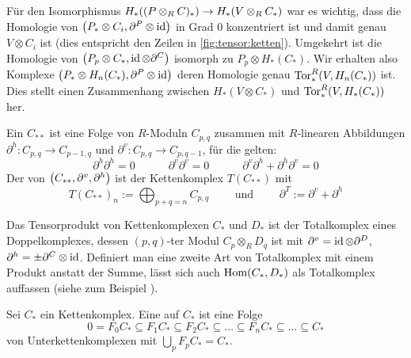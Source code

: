 \begin{bemerkung}[{name=[zu \autoref{lem:projaufl_iso_hom}]}]
	Für den Isomorphismus $H_*\enbrace*{(P \otimes_R C)_*} \to H_*(V \otimes_R C_*)$ war es wichtig, dass die Homologie von $\enbrace*{P_* \otimes C_i,\partial^P \otimes \id}$ in Grad $0$ konzentriert ist und damit genau $V \otimes C_i$ ist (dies entspricht den Zeilen in \cref{fig:tensor:ketten}).
	Umgekehrt ist die Homologie von $\enbrace*{P_p \otimes C_*, \id \otimes \partial^C}$ isomorph zu $P_p \otimes H_*(C_*)$.
	Wir erhalten also Komplexe $\enbrace*{P_* \otimes H_n(C_*), \partial^P \otimes \id}$ deren Homologie genau $\Tor^R_* \enbrace*{V, H_n(C_*)}$ ist.
	Dies stellt einen Zusammenhang zwischen $H_*(V \otimes C_*)$ und $\Tor_*^R \enbrace*{V, H_*(C_*)}$ her.
\end{bemerkung}

\begin{definition}[{name=[Doppelkomplex und Totalkomplex]}]
	Ein  $C_{**}$ ist eine Folge von $R$-Moduln $C_{p,q}$ zusammen mit $R$-linearen Abbildungen $\partial^h \colon C_{p,q} \to C_{p-1,q}$ und $\partial^v \colon C_{p,q} \to C_{p,q-1}$, für die gelten:
	\[
		\partial^h  \partial^h =0 \qquad \quad \partial^v  \partial^v=0 \qquad \quad \partial^v  \partial^h + \partial^h \partial^v =0
	\]
	Der  von $\enbrace*{C_{**}, \partial^v,\partial^h}$ ist der Kettenkomplex $T(C_{**})$ mit 
	\[
		T(C_{**})_n := \bigoplus_{p+q=n} C_{p,q} \qquad \text{ und } \qquad \partial^T := \partial^v + \partial^h
	\]
\end{definition}

\begin{beispiel}[{name=[Tensorprodukt als Totalkomplex]}]
	Das Tensorprodukt von Kettenkomplexen $C_*$ und $D_*$ ist der Totalkomplex eines Doppelkomplexes, dessen $(p,q)$-ter Modul $C_p \otimes_R D_q$ ist mit $\partial^v = \id \otimes \partial^D$, $\partial^h = {\pm {\partial^C \otimes \id}}$.
	Definiert man eine zweite Art von Totalkomplex mit einem Produkt anstatt der Summe, lässt sich auch $\Hom(C_*,D_*)$ als Totalkomplex auffassen (siehe zum Beispiel \cite[V.1, S.~167ff]{HiltonHomAlg}).
\end{beispiel}

\begin{definition}[{name=[Filtrierung]}]
	Sei $C_*$ ein Kettenkomplex. Eine  auf $C_*$ ist eine Folge 
	\[
		0 = F_0 C_* \subseteq F_1 C_*  \subseteq F_2 C_* \subseteq \ldots \subseteq F_n C_* \subseteq \ldots \subseteq C_*
	\] 
	von  Unterkettenkomplexen mit $\bigcup_{p} F_p C_* = C_*$.
\end{definition}

